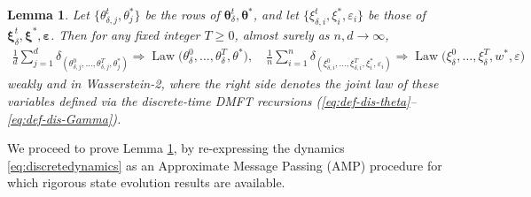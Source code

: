 \documentclass[11pt,letterpaper,reqno]{amsart}
\newtheorem{lem}[thm]{Lemma}
\theoremstyle{definition}
\def\eps{\varepsilon}
\def\Law{\operatorname{Law}}
\def\beps{\boldsymbol{\varepsilon}}
\def\btheta{\boldsymbol{\theta}}
\def\bxi{\boldsymbol{\xi}}
\begin{document}
\begin{lem}\label{lem:finite_dim_converge}
Let $\{\theta_{\delta,j}^t,\theta_j^*\}$ be the rows of
$\btheta_\delta^t,\btheta^*$, and let $\{\xi_{\delta,i}^t,\xi_i^*,\eps_i\}$ be 
those of $\bxi_\delta^t,\bxi^*,\beps$.
Then for any fixed integer $T \geq 0$, almost surely as $n,d\rightarrow\infty$,
\begin{align*}
\frac{1}{d}\sum_{j=1}^d \delta_{(\theta^0_{\delta,j},\ldots,
\theta^T_{\delta,j},\theta^\ast_j)}
\Rightarrow \Law\big(\theta^0_\delta,\ldots, \theta^T_\delta,\theta^\ast\big),
\quad \frac{1}{n}\sum_{i=1}^n \delta_{(\xi^0_{\delta,i}, \ldots,
\xi^T_{\delta,i},\xi_i^*,\eps_i)}
\Rightarrow \Law\big(\xi^0_\delta,\ldots,\xi^T_\delta,w^*,\eps\big)
\end{align*}
weakly and in Wasserstein-2, where the right side denotes the joint law of these
variables defined via the discrete-time DMFT recursions
(\ref{eq:def-dis-theta}--\ref{eq:def-dis-Gamma}).
\end{lem}

We proceed to prove Lemma \ref{lem:finite_dim_converge},
by re-expressing the dynamics \eqref{eq:discretedynamics} as an Approximate
Message Passing (AMP) procedure
for which rigorous state evolution results are available. 
\end{document}
